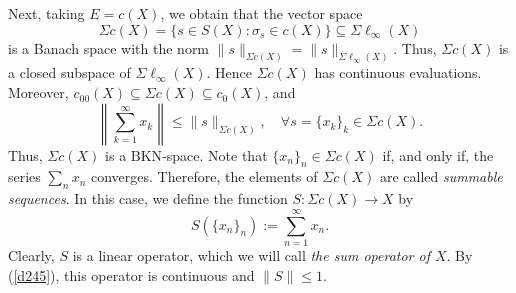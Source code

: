 \documentclass[14pt, a4paper]{article}  %
\providecommand{\norm}[1]{\left\lVert#1\right\rVert}
\newcommand{\BKn}{\text{BKN}}
\begin{document}
	
	Next, taking $E = c(X)$, we obtain that the vector space
	\begin{equation}\label{d264_b} 
		\Sigma c(X) = \{s \in S(X): \sigma_s \in c(X)\} \subseteq \Sigma \ell_{\infty}(X)
	\end{equation}
	is a Banach space with the norm  $\|s\|_{\Sigma c(X)} = \|s\|_{\Sigma \ell_{\infty}(X)}.$ Thus, $\Sigma c(X)$ is a closed subspace of $\Sigma \ell_{\infty}(X)$.
	Hence $\Sigma c(X)$ has continuous evaluations. Moreover,   $c_{00}(X) \subseteq \Sigma c(X) \subseteq c_0(X)$, and
	\begin{equation}\label{d245}  
		\norm{\sum_{k=1}^{\infty} x_k} \leq \|s\|_{\Sigma c(X)}, \quad \forall s = \{x_k\}_k \in \Sigma c(X).
	\end{equation}
	Thus, $\Sigma c(X)$ is a $\BKn$-space. Note that $\{x_n\}_n \in \Sigma c(X)$ if, and only if, the series $\sum_n x_n$ converges. Therefore,   the elements of $\Sigma c(X)$ are called \emph{summable sequences}. In this case, we define the function $S: \Sigma c(X) \to X$ by
	\begin{equation}\label{d247}
		S(\{x_n\}_n) := \sum_{n=1}^{\infty} x_n.
	\end{equation}
	Clearly, $S$ is a linear operator, which we will call \emph{the sum operator of $X$}. By (\ref{d245}), this operator is continuous and $\|S\| \leq 1$.
	
 
	
\end{document}
